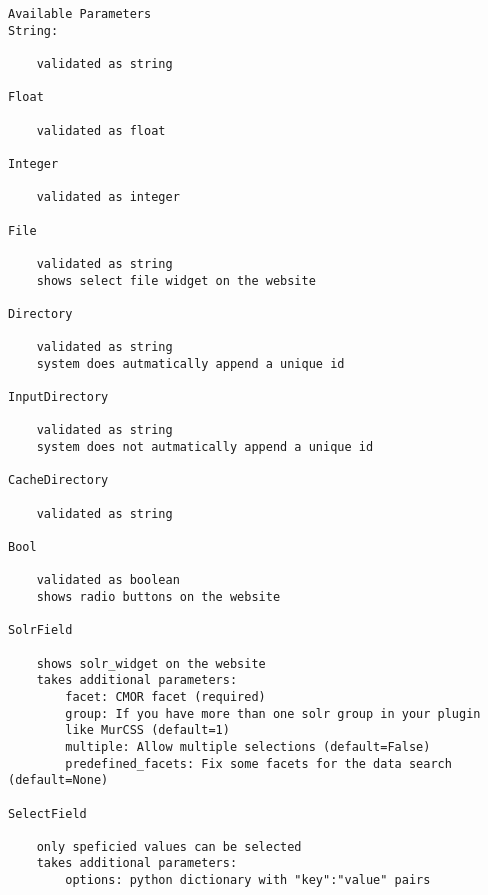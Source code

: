 \documentclass[a4paper,11pt]{ltxdoc}
\begin{document}
\begin{verbatim}
Available Parameters
String:

    validated as string

Float

    validated as float

Integer

    validated as integer

File

    validated as string
    shows select file widget on the website

Directory

    validated as string
    system does autmatically append a unique id

InputDirectory

    validated as string
    system does not autmatically append a unique id

CacheDirectory

    validated as string

Bool

    validated as boolean
    shows radio buttons on the website

SolrField

    shows solr_widget on the website
    takes additional parameters:
        facet: CMOR facet (required)
        group: If you have more than one solr group in your plugin 
		like MurCSS (default=1)
        multiple: Allow multiple selections (default=False)
        predefined_facets: Fix some facets for the data search (default=None)

SelectField

    only speficied values can be selected
    takes additional parameters:
        options: python dictionary with "key":"value" pairs
\end{verbatim}
\end{document}
